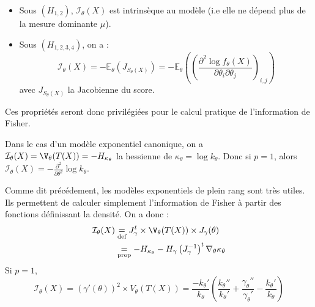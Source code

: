 \begin{prop}
    \begin{itemize}
        \item Sous $(H_{1,2})$, $ \mathcal{I}_\theta(X)$ est intrinsèque au modèle (i.e elle ne dépend plus de 
        la mesure dominante $ \mu$). 
        \item Sous $(H_{1,2,3,4})$, on a : 
        $$ 
            \mathcal{I}_\theta(X) = - \mathbb{E}_\theta(J_{S_\theta(X)}) 
            = - \mathbb{E}_\theta \left( \left( \frac{\partial ^2 \log f_\theta(X)}{\partial \theta_i \partial \theta_j}\right)_{i,j}\right)
        $$
        avec $J_{S_\theta(X)}$ la Jacobienne du score. 
    \end{itemize}
\end{prop}

Ces propriétés seront donc privilégiées pour le calcul pratique de l'information de Fisher. 

\begin{prop}
    Dans le cas d'un modèle exponentiel canonique, on a $ \mathcal{I}_\theta(X) = \V_\theta(T(X)) = - H_{ \kappa_\theta}$ 
    la hessienne de $ \kappa_\theta = \log k_\theta$. 
    Donc si $ p = 1$, alors $ \mathcal{I}_\theta(X) = - \frac{ \partial ^2}{ \partial \theta^2} \log k_\theta$. 
\end{prop}

\begin{proposition}
    Comme dit précédement, les modèles exponentiels de plein rang sont très utiles. 
    Ils permettent de calculer simplement l'information de Fisher à partir des fonctions 
    définissant la densité. On a donc : 
        \begin{align*}
            \mathcal{I}_\theta(X) &\underset{\text{def}}{=} J_{\gamma}^t \times \V_\theta(T(X)) \times J_\gamma(\theta) \\ 
            &\underset{\text{prop}}{=} - H_{ \kappa_\theta} - H_{\gamma} \left( J_{\gamma}^{-1}\right)^t \nabla_\theta \kappa_\theta
        \end{align*}
    Si $p = 1$, 
        $$ \mathcal{I}_\theta(X) = ( \gamma'(\theta))^2 \times V_\theta(T(X))
            = \frac{- k_\theta'}{k_\theta} \left( \frac{k_\theta ''}{k_\theta'} + \frac{ \gamma_\theta ''}{\gamma_\theta'} 
            - \frac{k_\theta'}{k_\theta}\right)
        $$
\end{proposition}

